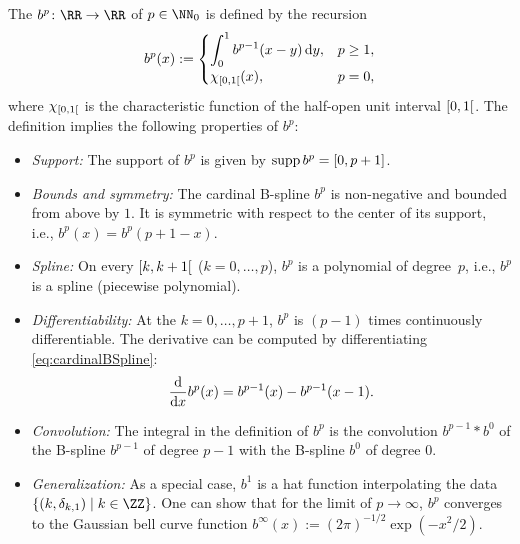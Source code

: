 The 
$b^p\colon \RR \to \RR$ of  $p \in \NN_0$
is defined by the recursion
\begin{equation}
  \label{eq:cardinalBSpline}
  b^p(x)
  :=
  \begin{cases}
    \displaystyle\int_0^1 b^{p-1}(x - y) \mathop{}\!\mathrm{d}{}y,&p \ge 1,\\
    \chi_{\mathopen[0, 1\mathclose[}(x),&p = 0,
  \end{cases}
\end{equation}
where $\chi_{\mathopen[0, 1\mathclose[}$ is the characteristic function of
the half-open unit interval $\mathopen[0, 1\mathclose[$.
The definition implies the following properties of $b^p$:
\begin{itemize}
  \item
  \emph{Support:}
  The support of $b^p$ is given by $\operatorname{supp} b^p = [0, p + 1]$.
  
  \item
  \emph{Bounds and symmetry:}
  The cardinal B-spline $b^p$ is non-negative and bounded from above by $1$.
  It is symmetric with respect to the center of its support, i.e.,
  $b^p(x) = b^p(p + 1 - x)$.
  
  \item
  \emph{Spline:}
  On every  $\mathopen[k, k+1\mathclose[$
  ($k = 0, \dotsc, p$), $b^p$ is a polynomial of degree~$p$, i.e.,
  $b^p$ is a spline (piecewise polynomial).
  
  \item
  \emph{Differentiability:}
  At the  $k = 0, \dotsc, p + 1$,
  $b^p$ is $(p - 1)$ times continuously differentiable.
  The derivative can be computed by differentiating
  \eqref{eq:cardinalBSpline}:
  \begin{equation}
    \label{eq:cardinalBSplineDerivative}
    \frac{\mathop{}\!\mathrm{d}}{\mathop{}\!\mathrm{d}{}x} b^p(x)
    = b^{p-1}(x) - b^{p-1}(x-1).
  \end{equation}
  
  \item
  \emph{Convolution:}
  The integral in the definition of $b^p$
  is the convolution $b^{p-1} \ast b^0$ of the B-spline $b^{p-1}$
  of degree $p - 1$ with the B-spline $b^0$ of degree $0$.
  
  \item
  \emph{Generalization:}
  As a special case, $b^1$ is a hat function interpolating the data
  $\{(k, \delta_{k,1}) \mid k \in \ZZ\}$.
  One can show that for the limit of $p \to \infty$,
  $b^p$ converges to the Gaussian bell curve function
  $b^\infty(x) := (2\pi)^{-1/2} \exp(-x^2/2)$.
\end{itemize}

